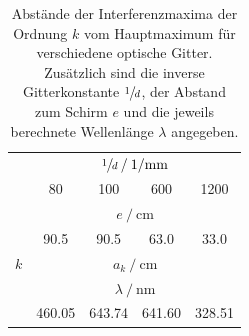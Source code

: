 \begin{table}
  \centering
  \caption{
    Abstände der Interferenzmaxima der Ordnung $k$ vom Hauptmaximum für verschiedene optische Gitter.
    Zusätzlich sind die inverse Gitterkonstante $\sfrac{1}{d}$, der Abstand zum Schirm $e$ und die jeweils berechnete Wellenlänge $\lambda$ angegeben.
  }
  \label{tab:mess_wellenlaenge}
  \begin{tabular}{S S S S S}
  \toprule
  &  \\
  \cmidrule(lr){2-5}
  & 80 & 100 & 600 & 1200 \\
  \midrule

  &  \\
  \cmidrule(lr){2-5}
  & 90.5 & 90.5 & 63.0 & 33.0 \\
  \midrule

  {$k$} &
   \\
  \midrule

  \midrule

  &  \\
  \cmidrule(lr){2-5}
  & 460.05  & 643.74  & 641.60  & 328.51  \\
  \bottomrule
  \end{tabular}
\end{table}
